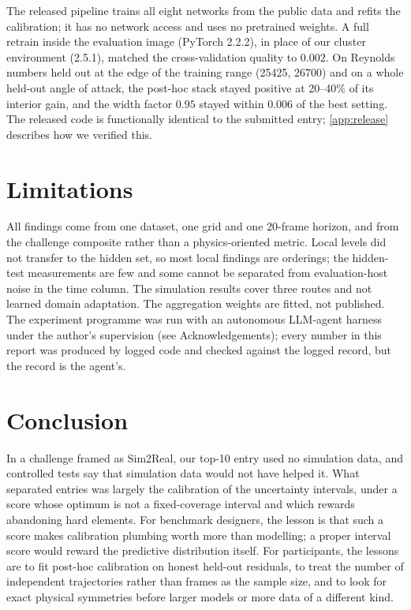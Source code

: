 \documentclass[10pt]{article}
\begin{document}
The released pipeline trains all eight networks from the public data and refits the calibration; it has no network access and uses no pretrained weights. A full retrain inside the evaluation image (PyTorch 2.2.2), in place of our cluster environment (2.5.1), matched the cross-validation quality to $0.002$. On Reynolds numbers held out at the edge of the training range (25425, 26700) and on a whole held-out angle of attack, the post-hoc stack stayed positive at 20--40\% of its interior gain, and the width factor $0.95$ stayed within $0.006$ of the best setting. The released code is functionally identical to the submitted entry; \cref{app:release} describes how we verified this.

\section{Limitations}

All findings come from one dataset, one grid and one 20-frame horizon, and from the challenge composite rather than a physics-oriented metric. Local levels did not transfer to the hidden set, so most local findings are orderings; the hidden-test measurements are few and some cannot be separated from evaluation-host noise in the time column. The simulation results cover three routes and not learned domain adaptation. The aggregation weights are fitted, not published. The experiment programme was run with an autonomous LLM-agent harness under the author's supervision (see Acknowledgements); every number in this report was produced by logged code and checked against the logged record, but the record is the agent's.

\section{Conclusion}

In a challenge framed as Sim2Real, our top-10 entry used no simulation data, and controlled tests say that simulation data would not have helped it. What separated entries was largely the calibration of the uncertainty intervals, under a score whose optimum is not a fixed-coverage interval and which rewards abandoning hard elements. For benchmark designers, the lesson is that such a score makes calibration plumbing worth more than modelling; a proper interval score would reward the predictive distribution itself. For participants, the lessons are to fit post-hoc calibration on honest held-out residuals, to treat the number of independent trajectories rather than frames as the sample size, and to look for exact physical symmetries before larger models or more data of a different kind.
\end{document}
